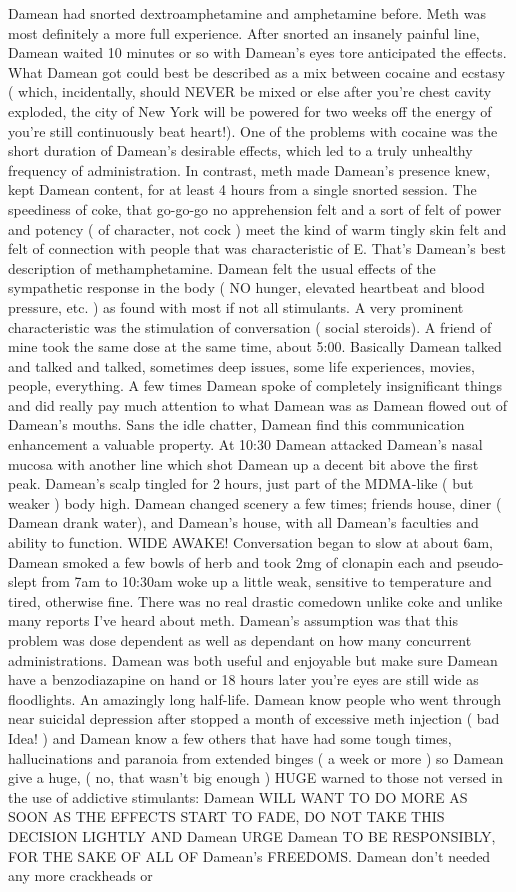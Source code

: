 \documentclass[12pt]{book}
\begin{document}
Damean had snorted dextroamphetamine and amphetamine before. Meth was most definitely a more full experience. After snorted an insanely painful line, Damean waited 10 minutes or so with Damean's eyes tore anticipated the effects. What Damean got could best be described as a mix between cocaine and ecstasy ( which, incidentally, should NEVER be mixed or else after you're chest cavity exploded, the city of New York will be powered for two weeks off the energy of you're still continuously beat heart!). One of the problems with cocaine was the short duration of Damean's desirable effects, which led to a truly unhealthy frequency of administration. In contrast, meth made Damean's presence knew, kept Damean content, for at least 4 hours from a single snorted session. The speediness of coke, that go-go-go no apprehension felt and a sort of felt of power and potency ( of character, not cock ) meet the kind of warm tingly skin felt and felt of connection with people that was characteristic of E. That's Damean's best description of methamphetamine. Damean felt the usual effects of the sympathetic response in the body ( NO hunger, elevated heartbeat and blood pressure, etc. ) as found with most if not all stimulants. A very prominent characteristic was the stimulation of conversation ( social steroids). A friend of mine took the same dose at the same time, about 5:00. Basically Damean talked and talked and talked, sometimes deep issues, some life experiences, movies, people, everything. A few times Damean spoke of completely insignificant things and did really pay much attention to what Damean was as Damean flowed out of Damean's mouths. Sans the idle chatter, Damean find this communication enhancement a valuable property. At 10:30 Damean attacked Damean's nasal mucosa with another line which shot Damean up a decent bit above the first peak. Damean's scalp tingled for 2 hours, just part of the MDMA-like ( but weaker ) body high. Damean changed scenery a few times; friends house, diner ( Damean drank water), and Damean's house, with all Damean's faculties and ability to function. WIDE AWAKE! Conversation began to slow at about 6am, Damean smoked a few bowls of herb and took 2mg of clonapin each and pseudo-slept from 7am to 10:30am woke up a little weak, sensitive to temperature and tired, otherwise fine. There was no real drastic comedown unlike coke and unlike many reports I've heard about meth. Damean's assumption was that this problem was dose dependent as well as dependant on how many concurrent administrations. Damean was both useful and enjoyable but make sure Damean have a benzodiazapine on hand or 18 hours later you're eyes are still wide as floodlights. An amazingly long half-life. Damean know people who went through near suicidal depression after stopped a month of excessive meth injection ( bad Idea! ) and Damean know a few others that have had some tough times, hallucinations and paranoia from extended binges ( a week or more ) so Damean give a huge, ( no, that wasn't big enough ) HUGE warned to those not versed in the use of addictive stimulants: Damean WILL WANT TO DO MORE AS SOON AS THE EFFECTS START TO FADE, DO NOT TAKE THIS DECISION LIGHTLY AND Damean URGE Damean TO BE RESPONSIBLY, FOR THE SAKE OF ALL OF Damean's FREEDOMS. Damean don't needed any more crackheads or 
\end{document}
